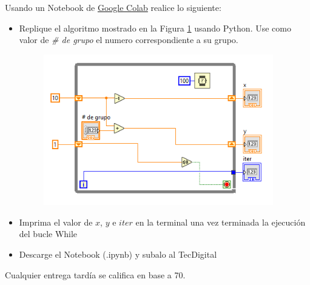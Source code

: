 \documentclass[12pt]{article}
\begin{document}
\setlength{\parindent}{0em}

Usando un Notebook de \href{https://colab.research.google.com/}{Google Colab} realice lo siguiente:

\begin{itemize}
    \item Replique el algoritmo mostrado en la Figura \ref{fig:while} usando Python. Use como valor de \emph{\# de grupo} el numero correspondiente a su grupo.
    \begin{figure}[H]
        \centering
        \includegraphics[width=10cm]{fig/t1.1.png}
        \caption{}
        \label{fig:while}
    \end{figure}
    \item Imprima el valor de $x$, $y$ e $iter$ en la terminal una vez terminada la ejecución del bucle While
    \item Descarge el Notebook (.ipynb) y subalo al TecDigital
\end{itemize}

Cualquier entrega tardía se califica en base a 70. 


% 
% 
\end{document}
